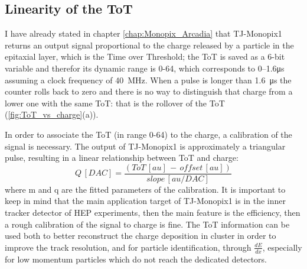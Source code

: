
    \subsection{Linearity of the ToT}
        I have already stated in chapter \ref{chap:Monopix_Arcadia} that TJ-Monopix1 returns an output signal proportional to the charge released by a particle in the epitaxial layer, which is the Time over Threshold; the ToT is saved as a 6-bit variable and therefor its dynamic range is 0-64, which corresponds to \numrange[range-phrase = --]{0}{1.6}\si{\us} assuming a clock frequency of \SI{40}{MHz}.
        When a pulse is longer than \SI{1.6}{\us} the counter rolls back to zero and there is no way to distinguish that charge from a lower one with the same ToT: that is the rollover of the ToT (\ref{fig:ToT_vs_charge}(a)).   

        In order to associate the ToT (in range 0-64) to the charge, a calibration of the signal is necessary. The output of TJ-Monopix1 is approximately a triangular pulse, resulting in a linear relationship between ToT and charge: 
        \begin{equation}
            Q\, [DAC] = \frac{(ToT\,[au]\, -\, offset\,[au])}{slope\, [au/DAC]} 
        \end{equation}\label{eq:calibration}
        where m and q are the fitted parameters of the calibration.
        It is important to keep in mind that the main application target of TJ-Monopix1 is in the inner tracker detector of HEP experiments, then the main feature is the efficiency, then a rough calibration of the signal to charge is fine. The ToT information can be used both to better reconstruct the charge deposition in cluster in order to improve the track resolution, and for particle identification, through $\frac{dE}{dx}$, especially for low momentum particles which do not reach the dedicated detectors.
                        
